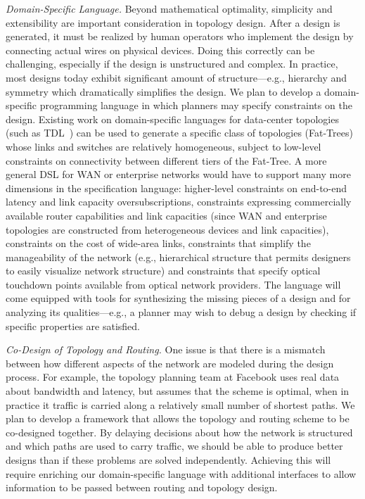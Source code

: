 \textit{Domain-Specific Language.}
%
Beyond mathematical optimality, simplicity and extensibility are
important consideration in topology design. After a design is
generated, it must be realized by human operators who implement the
design by connecting actual wires on physical devices. Doing this
correctly can be challenging, especially if the design is unstructured
and complex. In practice, most designs today exhibit significant
amount of structure---e.g., hierarchy and symmetry which dramatically
simplifies the design.
%
We plan to develop a domain-specific programming language in which
planners may specify constraints on the design. Existing work on
domain-specific languages for data-center topologies (such as
TDL~\cite{condor}) can be used to generate a specific class of
topologies (Fat-Trees) whose links and switches are relatively
homogeneous, subject to low-level constraints on connectivity between
different tiers of the Fat-Tree. A more general DSL for WAN or
enterprise networks would have to support many more dimensions in the
specification language: higher-level constraints on end-to-end latency
and link capacity oversubscriptions, constraints expressing
commercially available router capabilities and link capacities (since
WAN and enterprise topologies are constructed from heterogeneous
devices and link capacities), constraints on the cost of wide-area
links, constraints that simplify the manageability of the network
(e.g., hierarchical structure that permits designers to easily
visualize network structure) and constraints that specify optical
touchdown points available from optical network providers.  The
language will come equipped with tools for synthesizing the missing
pieces of a design and for analyzing its qualities---e.g., a planner
may wish to debug a design by checking if specific properties are
satisfied.

\textit{Co-Design of Topology and Routing.}
%
One issue is that there is a mismatch between how different aspects of
the network are modeled during the design process. For example, the
topology planning team at Facebook uses real data about bandwidth and
latency, but assumes that the scheme is optimal, when in practice it
traffic is carried along a relatively small number of shortest
paths. We plan to develop a framework that allows the topology and
routing scheme to be co-designed together. By delaying decisions about
how the network is structured and which paths are used to carry
traffic, we should be able to produce better designs than if these
problems are solved independently. Achieving this will require
enriching our domain-specific language with additional interfaces to
allow information to be passed between routing and topology design.

